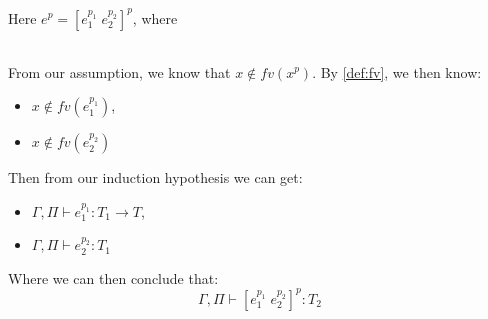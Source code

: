 \item[\runa{T-App}] Here $e^p=[e_1^{p_1} \; e_2^{p_2}]^p$, where
\begin{figure}[H]
	\setlength\tabcolsep{8pt}
	\begin{tabular}{l}
		
	\end{tabular}
\end{figure}
From our assumption, we know that $x\notin fv(x^p)$.
By \cref{def:fv}, we then know:
\begin{itemize}
	\item $x\notin fv(e_1^{p_1})$,
	\item $x\notin fv(e_2^{p_2})$
\end{itemize}
Then from our induction hypothesis we can get:
\begin{itemize}
	\item $\Gamma,\Pi\vdash e_1^{p_1}:T_1\rightarrow T$,
	\item $\Gamma,\Pi\vdash e_2^{p_2}:T_1$
\end{itemize}
Where we can then conclude that:
$$\Gamma,\Pi\vdash [e_1^{p_1} \; e_2^{p_2}]^{p}:T_2$$
